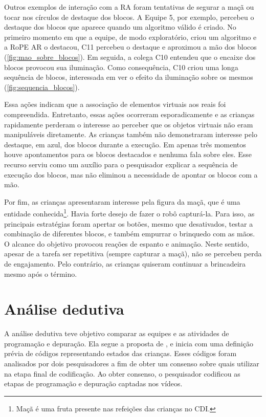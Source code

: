 Outros exemplos de interação com a RA foram tentativas de segurar a maçã ou tocar nos círculos de destaque dos blocos. A Equipe 5, por exemplo, percebeu o destaque dos blocos que aparece quando um algoritmo válido é criado. No primeiro momento em que a equipe, de modo exploratório, criou um algoritmo e a RoPE AR o destacou, C11 percebeu o destaque e aproximou a mão dos blocos (\autoref{fig:mao_sobre_blocos}). Em seguida, a colega C10 entendeu que o encaixe dos blocos provocou sua iluminação. Como consequência, C10 criou uma longa sequência de blocos, interessada em ver o efeito da iluminação sobre os mesmos  (\autoref{fig:sequencia_blocos}).

Essa ações indicam que a associação de elementos virtuais aos reais foi compreendida. Entretanto, essas ações ocorreram esporadicamente e as crianças rapidamente perderam o interesse ao perceber que os objetos virtuais não eram manipuláveis diretamente. As crianças também não demonstraram interesse pelo destaque, em azul, dos blocos durante a execução. Em apenas três momentos houve apontamentos para os blocos destacados e nenhuma fala sobre eles. Esse recurso serviu como um auxílio para o pesquisador explicar a sequência de execução dos blocos, mas não eliminou a necessidade de apontar os blocos com a mão.

Por fim, as crianças apresentaram interesse pela figura da maçã, que é uma entidade conhecida\footnote{Maçã é uma fruta presente nas refeições das crianças no CDI.}. Havia forte desejo de fazer o robô capturá-la. Para isso, as principais estratégias foram apertar os botões, mesmo que desativados, testar a combinação de diferentes blocos, e também empurrar o brinquedo com as mãos. O alcance do objetivo provocou reações de espanto e animação. Neste sentido, apesar de a tarefa ser repetitiva (sempre capturar a maçã), não se percebeu perda de engajamento. Pelo contrário, as crianças quiseram continuar a brincadeira mesmo após o término.

\section{Análise dedutiva}

A análise dedutiva teve objetivo comparar as equipes e as atividades de programação e depuração. Ela segue a proposta de , e inicia com uma definição prévia de códigos representando estados das crianças. Esses códigos foram analisados por dois pesquisadores a fim de obter um consenso sobre quais utilizar na etapa final de codificação. Ao obter consenso, o pesquisador codificou as etapas de programação e depuração captadas nos vídeos.

